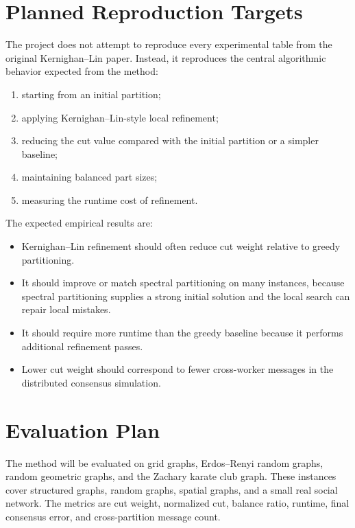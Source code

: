 \documentclass[11pt]{article}
\begin{document}
\section{Planned Reproduction Targets}

The project does not attempt to reproduce every experimental table from the
original Kernighan--Lin paper. Instead, it reproduces the central algorithmic
behavior expected from the method:
\begin{enumerate}
    \item starting from an initial partition;
    \item applying Kernighan--Lin-style local refinement;
    \item reducing the cut value compared with the initial partition or a
    simpler baseline;
    \item maintaining balanced part sizes;
    \item measuring the runtime cost of refinement.
\end{enumerate}

The expected empirical results are:
\begin{itemize}
    \item Kernighan--Lin refinement should often reduce cut weight relative to
    greedy partitioning.
    \item It should improve or match spectral partitioning on many instances,
    because spectral partitioning supplies a strong initial solution and the
    local search can repair local mistakes.
    \item It should require more runtime than the greedy baseline because it
    performs additional refinement passes.
    \item Lower cut weight should correspond to fewer cross-worker messages in
    the distributed consensus simulation.
\end{itemize}

\section{Evaluation Plan}

The method will be evaluated on grid graphs, Erdos--Renyi random graphs,
random geometric graphs, and the Zachary karate club graph. These instances
cover structured graphs, random graphs, spatial graphs, and a small real social
network. The metrics are cut weight, normalized cut, balance ratio, runtime,
final consensus error, and cross-partition message count.
\end{document}
